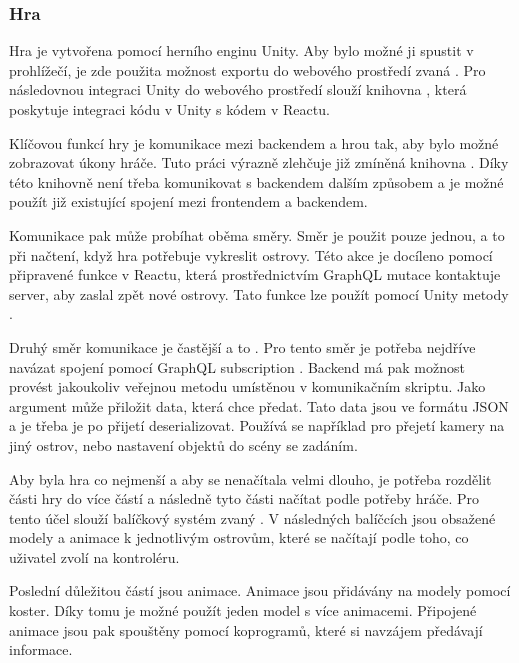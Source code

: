 \subsubsection{Hra}
Hra je vytvořena pomocí herního enginu Unity. Aby bylo možné ji spustit v prohlížečí, je zde použita možnost exportu do webového prostředí zvaná .
Pro následovnou integraci Unity do webového prostředí slouží knihovna \cite{react-unity-webgl}, která poskytuje integraci kódu v Unity s kódem v Reactu.

Klíčovou funkcí hry je komunikace mezi backendem a hrou tak, aby bylo možné zobrazovat úkony hráče. Tuto práci výrazně zlehčuje již zmíněná knihovna \cite{react-unity-webgl}. Díky této knihovně není třeba komunikovat s backendem dalším způsobem a je možné použít již existující spojení mezi frontendem a backendem.\par
Komunikace pak může probíhat oběma směry. Směr  je použit pouze jednou, a to při načtení, když hra potřebuje vykreslit ostrovy. Této akce je docíleno pomocí připravené funkce v Reactu, která prostřednictvím GraphQL mutace  kontaktuje server, aby zaslal zpět nové ostrovy. Tato funkce lze použít pomocí Unity metody .\par
Druhý směr komunikace je častější a to . Pro tento směr je potřeba nejdříve navázat spojení pomocí GraphQL subscription . Backend má pak možnost provést jakoukoliv veřejnou metodu umístěnou v komunikačním skriptu. Jako argument může přiložit data, která chce předat. Tato data jsou ve formátu JSON a je třeba je po přijetí deserializovat. Používá se například pro přejetí kamery na jiný ostrov, nebo nastavení objektů do scény se zadáním.

Aby byla hra co nejmenší a aby se nenačítala velmi dlouho, je potřeba rozdělit části hry do více částí a následně tyto části načítat podle potřeby hráče. Pro tento účel slouží balíčkový systém zvaný \cite{AssetBundle}. V následných balíčcích jsou obsažené modely a animace k jednotlivým ostrovům, které se načítají podle toho, co uživatel zvolí na kontroléru.

Poslední důležitou částí jsou animace. Animace jsou přidávány na modely pomocí koster. Díky tomu je možné použít jeden model s více animacemi. Připojené animace jsou pak spouštěny pomocí koprogramů, které si navzájem předávají informace. 
